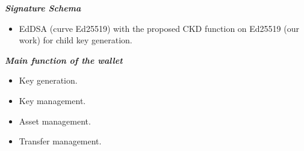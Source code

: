 {\textit {\textbf{Signature Schema}}}
\begin{itemize}
    \item EdDSA (curve Ed25519) with the proposed CKD function on Ed25519 (our work) for child key generation.
\end{itemize}

{\textit {\textbf{Main function of the wallet}}}
\begin{itemize}
    \item Key generation.
    \item Key management.
    \item Asset management.
    \item Transfer management.
\end{itemize}